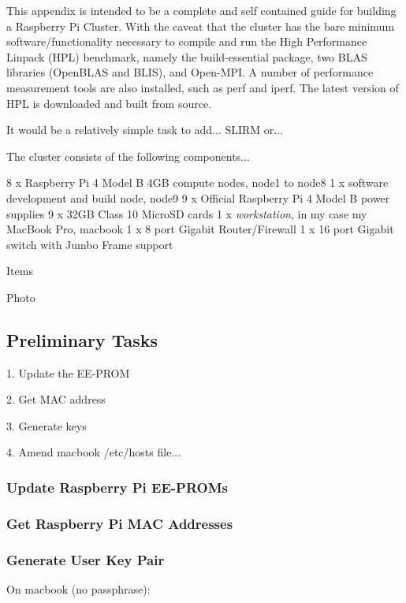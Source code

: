 \documentclass{article}
\begin{document}
This appendix is intended to be a complete and self contained guide for building a Raspberry Pi Cluster. With the caveat that the cluster has the bare minimum software/functionality necessary to compile and run the High Performance Linpack (HPL) benchmark, namely the build-essential package, two BLAS libraries (OpenBLAS and BLIS), and Open-MPI. A number of performance measurement tools are also installed, such as perf and iperf. The latest version of HPL is downloaded and built from source.

It would be a relatively simple task to add... SLIRM or...

The cluster consists of the following components...

8 x Raspberry Pi 4 Model B 4GB compute nodes, node1 to node8
1 x software development and build node, node9
9 x Official Raspberry Pi 4 Model B power supplies
9 x 32GB Class 10 MicroSD cards
1 x \emph{workstation}, in my case my MacBook Pro, macbook
1 x 8 port Gigabit Router/Firewall
1 x 16 port Gigabit switch with Jumbo Frame support

Items

Photo


\subsection{Preliminary Tasks}

1. Update the EE-PROM

2. Get MAC address

3. Generate keys

4. Amend macbook /etc/hosts file...



\subsubsection{Update Raspberry Pi EE-PROMs}



\subsubsection{Get Raspberry Pi MAC Addresses}



\subsubsection{Generate User Key Pair}

On macbook (no passphrase):
\end{document}
